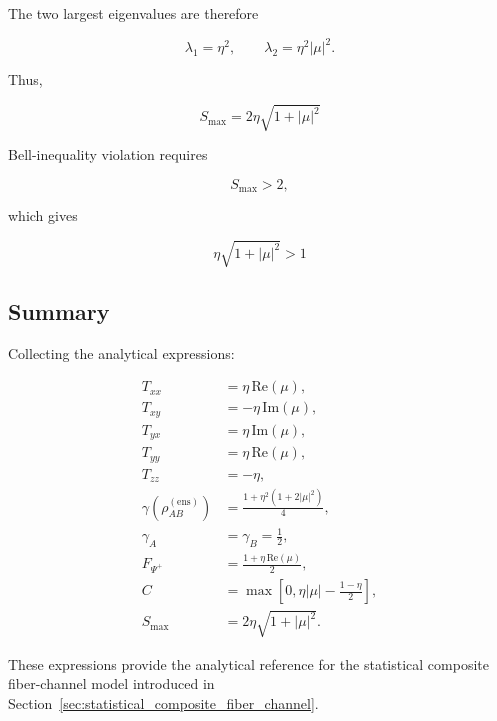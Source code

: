 The two largest eigenvalues are therefore

\[
\lambda_1
=
\eta^2,
\qquad
\lambda_2
=
\eta^2|\mu|^2.
\]

Thus,

\begin{equation}
\boxed{
S_{\max}
=
2\eta
\sqrt{
1+|\mu|^2
}
}
\label{eq:appendix_ensemble_chsh}
\end{equation}

Bell-inequality violation requires

\begin{equation}
S_{\max}>2,
\end{equation}

which gives

\begin{equation}
\boxed{
\eta
\sqrt{
1+|\mu|^2
}
>
1
}
\label{eq:appendix_ensemble_chsh_threshold}
\end{equation}


\subsection*{Summary}

Collecting the analytical expressions:

\[
\boxed{
\begin{aligned}
T_{xx}
&=
\eta\,\mathrm{Re}(\mu),
\\
T_{xy}
&=
-\eta\,\mathrm{Im}(\mu),
\\
T_{yx}
&=
\eta\,\mathrm{Im}(\mu),
\\
T_{yy}
&=
\eta\,\mathrm{Re}(\mu),
\\
T_{zz}
&=
-\eta,
\\[2mm]
\gamma
\left(
\rho_{AB}^{(\mathrm{ens})}
\right)
&=
\frac{
1+\eta^2(1+2|\mu|^2)
}{4},
\\
\gamma_A
&=
\gamma_B
=
\frac12,
\\
F_{\Psi^+}
&=
\frac{
1+\eta\,\mathrm{Re}(\mu)
}{2},
\\
C
&=
\max
\left[
0,
\eta|\mu|
-
\frac{1-\eta}{2}
\right],
\\
S_{\max}
&=
2\eta
\sqrt{
1+|\mu|^2
}.
\end{aligned}
}
\]

These expressions provide the analytical reference for the statistical composite fiber-channel model introduced in Section~\ref{sec:statistical_composite_fiber_channel}.